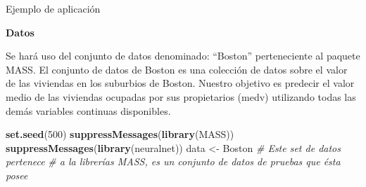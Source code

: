 \documentclass[
  ignorenonframetext,
]{beamer}
\newenvironment{Shaded}{\begin{snugshade}}{\end{snugshade}}
\newcommand{\CommentTok}[1]{\textcolor[rgb]{0.56,0.35,0.01}{\textit{#1}}}
\newcommand{\DataTypeTok}[1]{\textcolor[rgb]{0.13,0.29,0.53}{#1}}
\newcommand{\DecValTok}[1]{\textcolor[rgb]{0.00,0.00,0.81}{#1}}
\newcommand{\FloatTok}[1]{\textcolor[rgb]{0.00,0.00,0.81}{#1}}
\newcommand{\KeywordTok}[1]{\textcolor[rgb]{0.13,0.29,0.53}{\textbf{#1}}}
\newcommand{\NormalTok}[1]{#1}
\newcommand{\OperatorTok}[1]{\textcolor[rgb]{0.81,0.36,0.00}{\textbf{#1}}}
\newcommand{\StringTok}[1]{\textcolor[rgb]{0.31,0.60,0.02}{#1}}
\begin{document}
\begin{frame}[fragile]{Ejemplo de aplicación}
\protect\hypertarget{ejemplo-de-aplicaciuxf3n}{}

\begin{block}{\textbf{Datos}}

Se hará uso del conjunto de datos denominado: ``Boston'' perteneciente
al paquete MASS. El conjunto de datos de Boston es una colección de
datos sobre el valor de las viviendas en los suburbios de Boston.
Nuestro objetivo es predecir el valor medio de las viviendas ocupadas
por sus propietarios (medv) utilizando todas las demás variables
continuas disponibles.

\begin{Shaded}
\begin{Highlighting}[]
\KeywordTok{set.seed}\NormalTok{(}\DecValTok{500}\NormalTok{)}
\KeywordTok{suppressMessages}\NormalTok{(}\KeywordTok{library}\NormalTok{(MASS))}
\KeywordTok{suppressMessages}\NormalTok{(}\KeywordTok{library}\NormalTok{(neuralnet))}
\NormalTok{data <-}\StringTok{ }\NormalTok{Boston }\CommentTok{# Este set de datos pertenece }
               \CommentTok{# a la librerías MASS, es un conjunto de datos de pruebas que ésta posee}
\end{Highlighting}
\end{Shaded}

\begin{Shaded}
\end{Shaded}


\end{block}
\end{frame}
\end{document}

